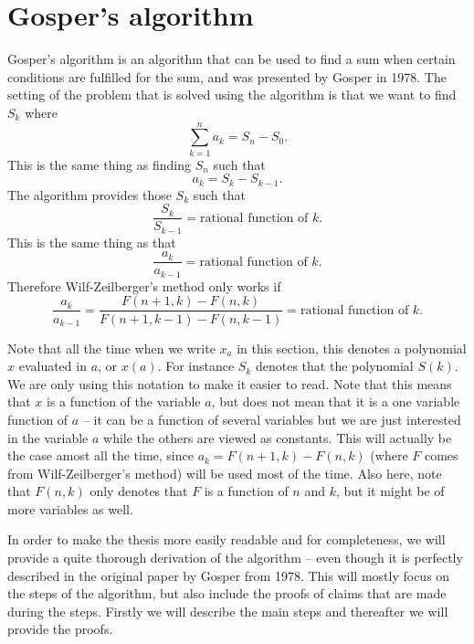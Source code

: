 \section{Gosper's algorithm}\label{Sec: Gosper}
Gosper's algorithm is an algorithm that can be used to find a sum when certain conditions are fulfilled for the sum, and was presented by Gosper in 1978. The setting of the problem that is solved using the algorithm is that we want to find $S_k$ where
\begin{equation}\label{Eq: Theory,Gosper1}
  \sum_{k=1}^n a_k = S_n-S_0.
\end{equation}
This is the same thing as finding $S_n$ such that
\begin{equation}\label{Eq: Theory,Gosper2}
  a_k = S_k - S_{k-1}.
\end{equation}
The algorithm provides those $S_k$ such that
\begin{equation}
  \frac{S_k}{S_{k-1}} = \text{rational function of } k.
\end{equation}
This is the same thing as that
\begin{equation}
  \frac{a_k}{a_{k-1}} = \text{rational function of } k.
\end{equation}
Therefore Wilf-Zeilberger's method only works if
\begin{equation}
  \frac{a_k}{a_{k-1}} = \frac{F(n+1,k)-F(n,k)}{F(n+1,k-1)-F(n,k-1)} = \text{rational function of } k.
\end{equation}

Note that all the time when we write $x_a$ in this section, this denotes a polynomial $x$ evaluated in $a$, or $x(a)$. For instance $S_k$ denotes that the polynomial $S(k)$. We are only using this notation to make it easier to read. Note that this means that $x$ is a function of the variable $a$, but does not mean that it is a one variable function of $a$ -- it can be a function of several variables but we are just interested in the variable $a$ while the others are viewed as constants. This will actually be the case amost all the time, since $a_k=F(n+1,k)-F(n,k)$ (where $F$ comes from Wilf-Zeilberger's method) will be used most of the time. Also here, note that $F(n,k)$ only denotes that $F$ is a function of $n$ and $k$, but it might be of more variables as well.

In order to make the thesis more easily readable and for completeness, we will provide a quite thorough derivation of the algorithm -- even though it is perfectly described in the original paper by Gosper from 1978. This will mostly focus on the steps of the algorithm, but also include the proofs of claims that are made during the steps. Firstly we will describe the main steps and thereafter we will provide the proofs.

